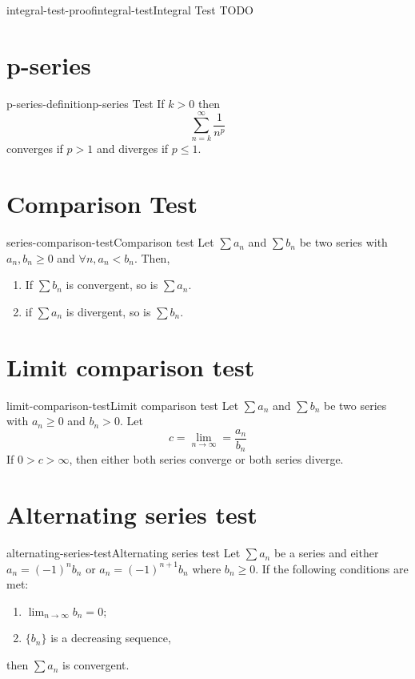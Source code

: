 \documentclass[preview]{standalone}
\begin{document}
\begin{snippetproof}{integral-test-proof}{integral-test}{Integral Test}{
    TODO
}
\end{snippetproof}

\section{p-series}

\begin{snippetdefinition}{p-series-definition}{p-series Test}
    If \(k > 0\) then \[\sum_{n=k}^\infty \frac{1}{n^p}\]
    converges if \(p > 1\) and diverges if \(p \leq 1\).
\end{snippetdefinition}

\section{Comparison Test}

\begin{snippettheorem}{series-comparison-test}{Comparison test}
    Let \(\sum a_n\) and \(\sum b_n\) be two series with \(a_n, b_n \geq 0\)
    and \(\forall n, a_n < b_n\). Then,
    \begin{enumerate}
        \item If \(\sum b_n\) is convergent, so is \(\sum a_n\).
        \item if \(\sum a_n\) is divergent, so is \(\sum b_n\).
    \end{enumerate}
\end{snippettheorem}

\section{Limit comparison test}

\begin{snippettheorem}{limit-comparison-test}{Limit comparison test}
    Let \(\sum a_n\) and \(\sum b_n\) be two series with \(a_n \geq 0\)
    and \(b_n > 0\). Let
    \[ c = \lim_{n \to \infty} = \frac{a_n}{b_n} \]
    If \(0 > c > \infty\), then either both series converge or both series diverge.
\end{snippettheorem}

\section{Alternating series test}

\begin{snippettheorem}{alternating-series-test}{Alternating series test}
    Let \(\sum a_n\) be a series
    and either \(a_n = {(-1)}^n b_n\) or \(a_n = {(-1)}^{n+1} b_n\)
    where \(b_n \geq 0\).
    If the following conditions are met:
    \begin{enumerate}
        \item \(\lim_{n \to \infty} b_n = 0\);
        \item \(\{b_n\}\) is a decreasing sequence,
    \end{enumerate}
    then \(\sum a_n\) is convergent.
\end{snippettheorem}
\end{document}
